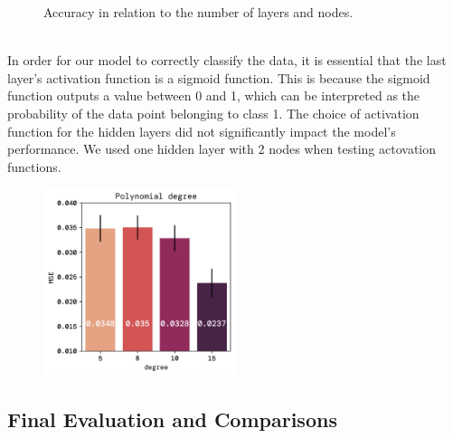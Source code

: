 \documentclass[twoside,11pt]{report}
\begin{document}
\begin{figure}[!ht]
\begin{minipage}[t]{0.5\textwidth - 1mm}
\begin{center}
            \end{center}
            \caption
            {
                Accuracy in relation to the number of layers and nodes.
            }\label{fig:MSE_layers_nodes}
        \end{minipage}
    \end{figure}

    \noindent
    \\
    In order for our model to correctly classify the data, it is essential that the last layer's activation function
    is a sigmoid function. This is because the sigmoid function outputs a value between 0 and 1, which can be
    interpreted as the probability of the data point belonging to class 1. The choice of activation function for the
    hidden layers did not significantly impact the model's performance.
    We used one hidden layer with 2 nodes when testing actovation functions.

    \begin{figure}
        \begin{center}
            \includegraphics[width=0.5\textwidth]{../runsAndFigures/MSE_degree.png}
        \end{center}
        \caption{}\label{fig:}
    \end{figure}



\subsection*{Final Evaluation and Comparisons}
\label{sec:comparisons2}
\end{document}
